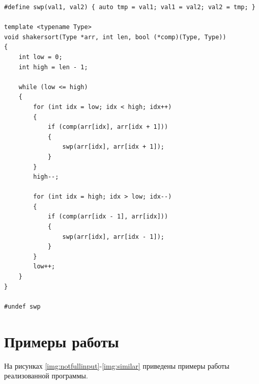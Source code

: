 \noindent\begin{minipage}{\textwidth}
\begin{lstlisting}[caption=Шейкреная сортировка, label=lst:shs]
#define swp(val1, val2) { auto tmp = val1; val1 = val2; val2 = tmp; }

template <typename Type>
void shakersort(Type *arr, int len, bool (*comp)(Type, Type))
{
    int low = 0;
    int high = len - 1;

    while (low <= high)
    {
        for (int idx = low; idx < high; idx++)
        {
            if (comp(arr[idx], arr[idx + 1]))
            {
                swp(arr[idx], arr[idx + 1]);
            }
        }
        high--;

        for (int idx = high; idx > low; idx--)
        {
            if (comp(arr[idx - 1], arr[idx]))
            {
                swp(arr[idx], arr[idx - 1]);
            }
        }
        low++;
    }
}

#undef swp
\end{lstlisting}
\end{minipage}

\section{Примеры работы}

На рисунках \ref{img:notfullinput}-\ref{img:similar} приведены примеры работы реализованной программы.

